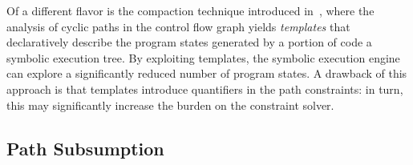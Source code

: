Of a different flavor is the compaction technique introduced in~\cite{SST-ATVA13}, where  the analysis of cyclic paths in the control flow graph yields {\em templates} that declaratively describe the program states generated by a portion of code  a  symbolic execution tree. By exploiting templates, the symbolic execution engine can explore a significantly reduced number of program states. A drawback of this approach is that templates introduce quantifiers in the path constraints: in turn, this may significantly increase the burden on the constraint solver.

\subsection{Path Subsumption} 
\label{ss:interpolation}
